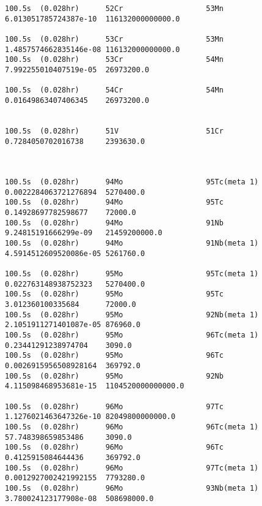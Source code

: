 \begin{lstlisting}[style=sOutputFile,caption={Final results for steel irradiation},label={listing:alexsteel}]
100.5s  (0.028hr)      52Cr                   53Mn                   6.013051785724387e-10  116132000000000.0     

100.5s  (0.028hr)      53Cr                   53Mn                   1.4857574662835146e-08 116132000000000.0     
100.5s  (0.028hr)      53Cr                   54Mn                   7.992255010407519e-05  26973200.0            

100.5s  (0.028hr)      54Cr                   54Mn                   0.01649863407406345    26973200.0            


100.5s  (0.028hr)      51V                    51Cr                   0.7284050702016738     2393630.0             



100.5s  (0.028hr)      94Mo                   95Tc(meta 1)           0.0022284063721276894  5270400.0             
100.5s  (0.028hr)      94Mo                   95Tc                   0.14928697782598677    72000.0               
100.5s  (0.028hr)      94Mo                   91Nb                   9.24815191666299e-09   21459200000.0         
100.5s  (0.028hr)      94Mo                   91Nb(meta 1)           4.5914512609520086e-05 5261760.0             

100.5s  (0.028hr)      95Mo                   95Tc(meta 1)           0.022763148938752323   5270400.0             
100.5s  (0.028hr)      95Mo                   95Tc                   3.012360100335684      72000.0               
100.5s  (0.028hr)      95Mo                   92Nb(meta 1)           2.1051911271401087e-05 876960.0              
100.5s  (0.028hr)      95Mo                   96Tc(meta 1)           0.23441291238974704    3090.0                
100.5s  (0.028hr)      95Mo                   96Tc                   0.0026915956508928164  369792.0              
100.5s  (0.028hr)      95Mo                   92Nb                   4.115098468953681e-15  1104520000000000.0    

100.5s  (0.028hr)      96Mo                   97Tc                   1.1276021463647326e-10 82049800000000.0      
100.5s  (0.028hr)      96Mo                   96Tc(meta 1)           57.748398659853486     3090.0                
100.5s  (0.028hr)      96Mo                   96Tc                   0.4125915084644436     369792.0              
100.5s  (0.028hr)      96Mo                   97Tc(meta 1)           0.0012927002421992155  7793280.0             
100.5s  (0.028hr)      96Mo                   93Nb(meta 1)           3.780024123177908e-08  508698000.0           


\end{lstlisting}
